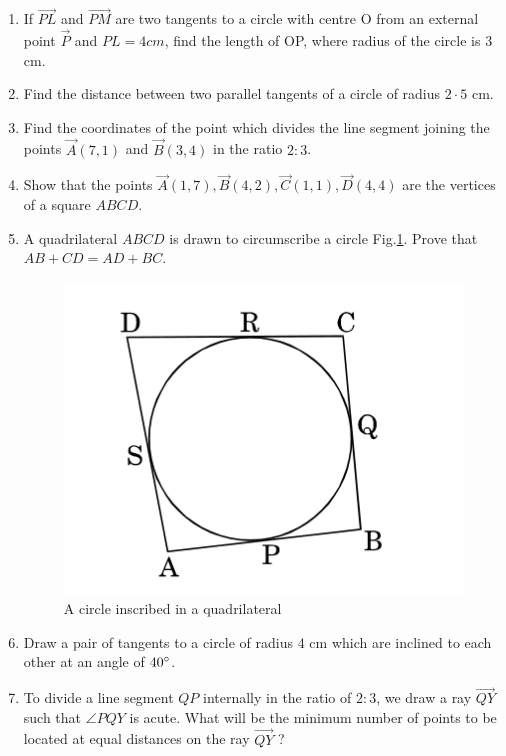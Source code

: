 \documentclass{article}
\begin{document}
\begin{enumerate}
\item If $ \vec{PL} $ and $ \vec{PM} $ are two tangents to a circle with centre O from an external point $\vec{P}$ and $PL = 4 cm$, find the length of OP, where radius of the circle is $3$ cm.
			
\item Find the distance between two parallel tangents of a circle of radius $2·5$ cm. 

\item Find the coordinates of the point which divides the line segment joining the points $\vec{A}(7, 1)$ and $\vec{B}( 3, 4)$ in the ratio $2 : 3$. 

\item Show that the points $\vec{A}(1,7), \vec{B}(4,2), \vec{C}(1,1), \vec{D}(4,4)$ are the vertices of a square $ABCD$. 

\item A quadrilateral $ABCD$ is drawn to circumscribe a circle Fig.\ref{fig:2}. Prove that $ AB + CD = AD + BC. $
	\begin{figure}[h]
	\centering
	\includegraphics[width=\columnwidth]{figs/2.jpg}
	\caption{A circle inscribed in a quadrilateral}
	\label{fig:2}
	\end{figure}

\item Draw a pair of tangents to a circle of radius $4$ cm which are inclined to each other at an angle of $40\degree$. 

\item To divide a line segment $QP$ internally in the ratio of $2 : 3$, we draw a ray $\vec{QY}$ such that $\angle PQY$ is acute. What will be the minimum number of points to be located at equal distances on the ray $\vec{QY}$ ? 


\end{enumerate}
\end{document}
